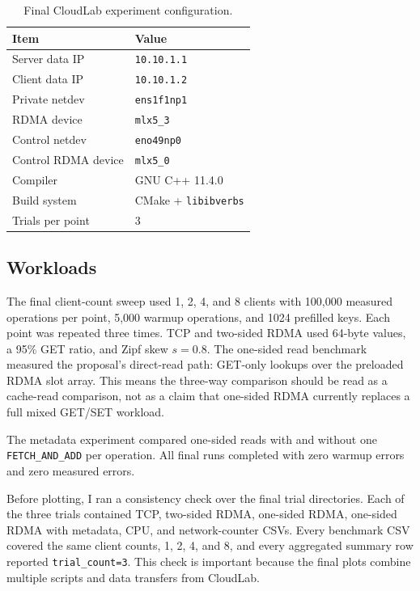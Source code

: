 \documentclass[letterpaper,twocolumn,10pt]{article}
\begin{document}
\begin{table}[t]
\centering
\caption{Final CloudLab experiment configuration.}
\label{tab:environment}
\begin{tabular}{ll}
\toprule
Item & Value \\
\midrule
Server data IP & \texttt{10.10.1.1} \\
Client data IP & \texttt{10.10.1.2} \\
Private netdev & \texttt{ens1f1np1} \\
RDMA device & \texttt{mlx5\_3} \\
Control netdev & \texttt{eno49np0} \\
Control RDMA device & \texttt{mlx5\_0} \\
Compiler & GNU C++ 11.4.0 \\
Build system & CMake + \texttt{libibverbs} \\
Trials per point & 3 \\
\bottomrule
\end{tabular}
\end{table}

\subsection{Workloads}

The final client-count sweep used 1, 2, 4, and 8 clients with 100,000 measured
operations per point, 5,000 warmup operations, and 1024 prefilled keys.  Each
point was repeated three times.  TCP and two-sided RDMA used 64-byte values, a
95\% GET ratio, and Zipf skew $s=0.8$.  The one-sided read benchmark measured
the proposal's direct-read path: GET-only lookups over the preloaded RDMA slot
array.  This means the three-way comparison should be read as a cache-read
comparison, not as a claim that one-sided RDMA currently replaces a full mixed
GET/SET workload.

The metadata experiment compared one-sided reads with and without one
\texttt{FETCH\_AND\_ADD} per operation.  All final runs completed with zero
warmup errors and zero measured errors.

Before plotting, I ran a consistency check over the final trial directories.
Each of the three trials contained TCP, two-sided RDMA, one-sided RDMA,
one-sided RDMA with metadata, CPU, and network-counter CSVs.  Every benchmark
CSV covered the same client counts, 1, 2, 4, and 8, and every aggregated
summary row reported \texttt{trial\_count=3}.  This check is important because
the final plots combine multiple scripts and data transfers from CloudLab.
\end{document}
